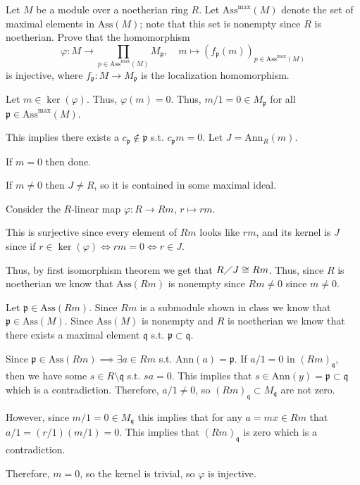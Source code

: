 \documentclass[12pt, letterpaper]{article}
\newcommand{\p}{\mathfrak{p}}
\newcommand{\Ass}{\mathrm{Ass}}
\newcommand{\Ann}{\mathrm{Ann}}
\newcommand{\mf}[1]{\mathfrak{#1}}
\begin{document}
\begin{problem}{}
    Let $M$ be a module over a noetherian ring $R$. Let $\Ass^\mathrm{max}(M )$ denote the set of maximal
elements in $\Ass(M )$; note that this set is nonempty since $R$ is noetherian. Prove that the
homomorphism
\[\varphi : M \to \prod_{p \in \Ass^{\mathrm{max}}(M)} M_\p, \quad m \mapsto (f_\p(m))_{p \in \Ass^{\mathrm{max}}(M)}\]
is injective, where $f_\p : M \to M_\p$ is the localization homomorphism.
\end{problem}
\begin{problemproof}
    Let $m \in \ker(\varphi)$. Thus, $\varphi(m)=0$. Thus, $m/1=0 \in M_\p$ for all $\p \in \Ass^\mathrm{max}(M )$.

    This implies there exists a $c_\p \notin \p$ s.t. $c_\p m = 0$. Let $J=\Ann_R(m)$.

    If $m = 0$ then done.

    If $m \neq 0$ then $J \neq R$, so it is contained in some maximal ideal.

    Consider the $R$-linear map $\varphi : R \to Rm$, $r \mapsto rm$.

    This is surjective since every element of $Rm$ looks like $rm$, and its kernel is $J$ since if $r \in \ker(\varphi) \iff rm = 0 \iff r \in J$.

    Thus, by first isomorphism theorem we get that $R \diagup J \cong Rm$. Thus, since $R$ is noetherian we know that $\Ass(Rm)$ is nonempty since $Rm \neq 0$ since $m \neq 0$.

    Let $\p \in \Ass(Rm)$. Since $Rm$ is a submodule shown in class we know that $\p \in \Ass(M)$. Since $\Ass(M)$ is nonempty and $R$ is noetherian we know that there exists a maximal element $\mf{q}$ s.t. $\p \subset \mf{q}$.

    Since $\p \in \Ass(Rm) \implies \exists a \in Rm$ s.t. $\Ann(a)=\p$. If $a/1 = 0$ in $(Rm)_\mf{q}$, then we have some $s \in R \setminus \mf{q}$ s.t. $sa=0$.
    This implies that $s \in \Ann(y)=\p \subset \mf{q}$ which is a contradiction. Therefore, $a/1 \neq 0$, so $(Rm)_\mf{q} \subset M_\mf{q}$ are not zero.

    However, since $m/1 = 0 \in M_\mf{q}$ this implies that for any $a=mx \in Rm$ that $a/1=(r/1)(m/1)=0$. This implies that $(Rm)_\mf{q}$ is zero which is a contradiction.

    Therefore, $m=0$, so the kernel is trivial, so $\varphi$ is injective.
\end{problemproof}
\end{document}
